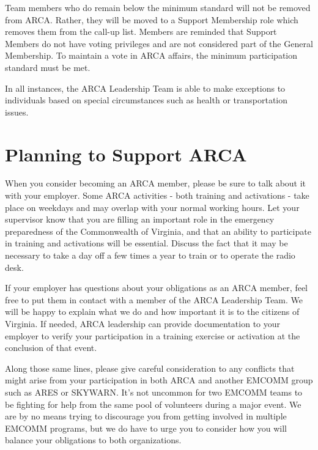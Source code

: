 \documentclass[pdflatex,letterpaper,twoside,12pt]{book}
\begin{document}
Team members who do remain below the minimum standard will not be removed from ARCA.  Rather, they will be moved to a Support Membership role which removes them from the call-up list.  Members are reminded that Support Members do not have voting privileges and are not considered part of the General Membership.  To maintain a vote in ARCA affairs, the minimum participation standard must be met.

In all instances, the ARCA Leadership Team is able to make exceptions to individuals based on special circumstances such as health or transportation issues.


\section{Planning to Support ARCA}

When you consider becoming an ARCA member, please be sure to talk about it with your employer.  Some ARCA activities - both training and activations - take place on weekdays and may overlap with your normal working hours.  Let your supervisor know that you are filling an important role in the emergency preparedness of the Commonwealth of Virginia, and that an ability to participate in training and activations will be essential.  Discuss the fact that it may be necessary to take a day off a few times a year to train or to operate the radio desk.

If your employer has questions about your obligations as an ARCA member, feel free to put them in contact with a member of the ARCA Leadership Team.  We will be happy to explain what we do and how important it is to the citizens of Virginia.  If needed, ARCA leadership can provide documentation to your employer to verify your participation in a training exercise or activation at the conclusion of that event.

Along those same lines, please give careful consideration to any conflicts that might arise from your participation in both ARCA and another EMCOMM group such as ARES or SKYWARN.  It's not uncommon for two EMCOMM teams to be fighting for help from the same pool of volunteers during a major event.  We are by no means trying to discourage you from getting involved in multiple EMCOMM programs, but we do have to urge you to consider how you will balance your obligations to both organizations.
\end{document}

